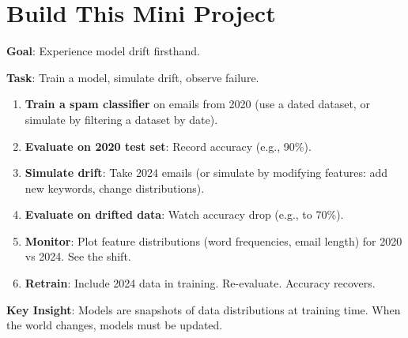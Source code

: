 \section{Build This Mini Project}

\textbf{Goal}: Experience model drift firsthand.

\textbf{Task}: Train a model, simulate drift, observe failure.

\begin{enumerate}
\item \textbf{Train a spam classifier} on emails from 2020 (use a dated dataset, or simulate by filtering a dataset by date).

\item \textbf{Evaluate on 2020 test set}: Record accuracy (e.g., 90\%).

\item \textbf{Simulate drift}: Take 2024 emails (or simulate by modifying features: add new keywords, change distributions).

\item \textbf{Evaluate on drifted data}: Watch accuracy drop (e.g., to 70\%).

\item \textbf{Monitor}: Plot feature distributions (word frequencies, email length) for 2020 vs 2024. See the shift.

\item \textbf{Retrain}: Include 2024 data in training. Re-evaluate. Accuracy recovers.
\end{enumerate}

\textbf{Key Insight}: Models are snapshots of data distributions at training time. When the world changes, models must be updated.

